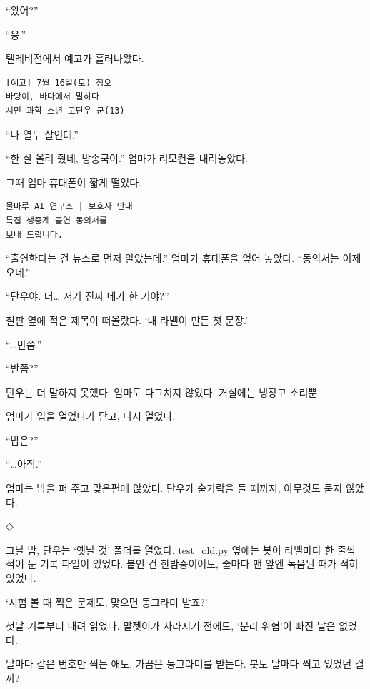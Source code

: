 \documentclass[
  korean,
  letterpaper,
  twoside,
  open=any,
  fontsize=12.5pt,
  headings=small]{scrbook}
\newcommand{\logfont}{\linespread{1}\fontsize{10.8}{15.2}\selectfont}
\begin{document}
``왔어?''

``응.''

텔레비전에서 예고가
흘러나왔다.

\begin{Verbatim}[samepage=true,frame=single,framesep=2.5mm,rulecolor=\color{gray},formatcom=\logfont]
[예고] 7월 16일(토) 정오
바당이, 바다에서 말하다
시민 과학 소년 고단우 군(13)
\end{Verbatim}

``나 열두 살인데.''

``한 살 올려 줬네, 방송국이.''
엄마가 리모컨을 내려놓았다.

그때 엄마 휴대폰이 짧게
떨었다.

\begin{Verbatim}[samepage=true,frame=single,framesep=2.5mm,rulecolor=\color{gray},formatcom=\logfont]
물마루 AI 연구소 | 보호자 안내
특집 생중계 출연 동의서를
보내 드립니다.
\end{Verbatim}

``출연한다는 건 뉴스로 먼저
알았는데.'' 엄마가 휴대폰을
엎어 놓았다. ``동의서는 이제
오네.''

``단우야. 너\ldots{} 저거 진짜
네가 한 거야?''

칠판 옆에 적은 제목이
떠올랐다. `내 라벨이 만든 첫
문장.'

``\ldots 반쯤.''

``반쯤?''

단우는 더 말하지 못했다.
엄마도 다그치지 않았다.
거실에는 냉장고 소리뿐.

엄마가 입을 열었다가 닫고,
다시 열었다.

``밥은?''

``\ldots 아직.''

엄마는 밥을 퍼 주고 맞은편에
앉았다. 단우가 숟가락을 들
때까지, 아무것도 묻지 않았다.

\begin{center}◇\end{center}\nopagebreak

그날 밤, 단우는 `옛날 것'
폴더를 열었다. test\_old.py
옆에는 봇이 라벨마다 한 줄씩
적어 둔 기록 파일이 있었다.
붙인 건 한밤중이어도, 줄마다
맨 앞엔 녹음된 때가 적혀
있었다.

`시험 볼 때 찍은 문제도,
맞으면 동그라미 받죠?'

첫날 기록부터 내려 읽었다.
말젯이가 사라지기 전에도,
`분리 위협'이 빠진 날은
없었다.

날마다 같은 번호만 찍는 애도,
가끔은 동그라미를 받는다. 봇도
날마다 찍고 있었던 걸까?
\end{document}
